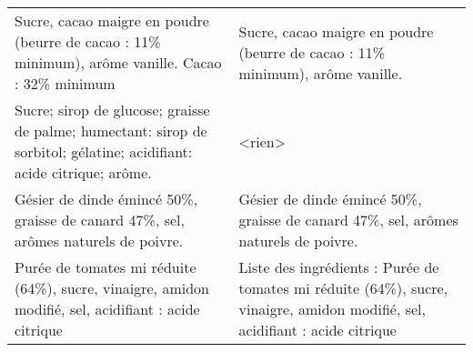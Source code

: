 \begin{longtable}{p{7cm}p{7cm}}
                                                                                                                                                                                                     Sucre, cacao maigre en poudre (beurre de cacao : 11\% minimum), arôme vanille. \newline Cacao : 32\% minimum &                                                                                                                                                                                                                                                                                                                                                                                          Sucre, cacao maigre en poudre (beurre de cacao : 11\% minimum), arôme vanille.  \\
                                                                                                                                                                                  Sucre; sirop de glucose; graisse de palme; humectant: sirop de sorbitol; gélatine; acidifiant: acide citrique; arôme. &                                                                                                                                                                                                                                                                                                                                                                                                                                                                  <rien> \\
                                                                                                                                                                                                                     Gésier de dinde émincé 50\%, graisse de canard 47\%, sel, arômes naturels de poivre. &                                                                                                                                                                                                                                                                                                                                                                                 Gésier de dinde émincé 50\%,  graisse de canard 47\%, sel, arômes naturels de poivre.  \newline   \\
                                                                                                                                                                                                   Purée de tomates mi réduite (64\%), sucre, vinaigre, amidon modifié, sel, acidifiant : acide citrique &                                                                                                                                                                                                                                                                                                                                         Liste des ingrédients :  Purée de tomates mi réduite (64\%), sucre, vinaigre, amidon modifié, sel, acidifiant :  \newline acide citrique \\

\end{longtable}
